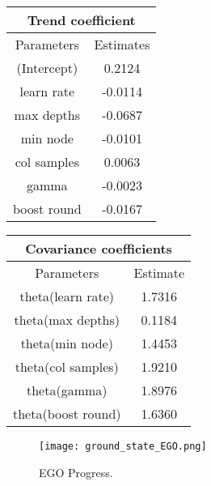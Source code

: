 \documentclass[12pt]{article}
\begin{document}
 \begin{minipage}[c]{0.5\textwidth}
 \centering
 \begin{tabular}{| c  c |} 
 \multicolumn{2}{c}{Trend  coefficient} \\
  \hline 
  Parameters & Estimates \\
 \hline 
 (Intercept) &     0.2124 \\
  learn rate  &   -0.0114\\
  max depths  &   -0.0687\\
    min node &    -0.0101\\
 col samples &     0.0063\\
       gamma &    -0.0023\\
 boost round &    -0.0167\\
 \hline
 \end{tabular}
\end{minipage}
\begin{minipage}[c]{0.5\textwidth}
 \centering
 \begin{tabular}{| c c |} 
 \multicolumn{2}{c}{Covariance coefficients} \\
 \hline
  Parameters &                   Estimate \\
  \hline
 theta(learn rate) &      1.7316 \\
 theta(max depths)  &    0.1184\\
   theta(min node)  &    1.4453\\
theta(col samples)  &    1.9210\\
      theta(gamma)  &    1.8976\\
theta(boost round)  &    1.6360\\

\hline
 \end{tabular}
\end{minipage}

  \begin{figure}[!hbtp]
\centering
\texttt{[image: ground\_state\_EGO.png]}
\caption{EGO Progress.}
\end{figure}
 
 \vspace*{1cm}
 
\end{document}

